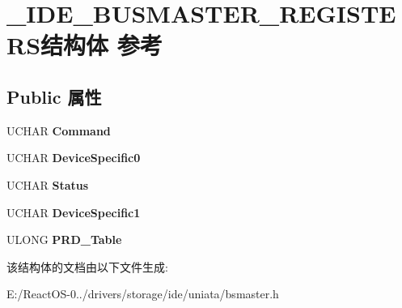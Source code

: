 \hypertarget{struct___i_d_e___b_u_s_m_a_s_t_e_r___r_e_g_i_s_t_e_r_s}{}\section{\+\_\+\+I\+D\+E\+\_\+\+B\+U\+S\+M\+A\+S\+T\+E\+R\+\_\+\+R\+E\+G\+I\+S\+T\+E\+R\+S结构体 参考}
\label{struct___i_d_e___b_u_s_m_a_s_t_e_r___r_e_g_i_s_t_e_r_s}
\subsection*{Public 属性}
\begin{DoxyCompactItemize}
\item 
\mbox{\label{struct___i_d_e___b_u_s_m_a_s_t_e_r___r_e_g_i_s_t_e_r_s_a3e1d123d5a6d4a881dce95d7d1324add}} 
U\+C\+H\+AR {\bfseries Command}
\item 
\mbox{\label{struct___i_d_e___b_u_s_m_a_s_t_e_r___r_e_g_i_s_t_e_r_s_a285bbf18e1f1a1dcab551e1d8a4a041f}} 
U\+C\+H\+AR {\bfseries Device\+Specific0}
\item 
\mbox{\label{struct___i_d_e___b_u_s_m_a_s_t_e_r___r_e_g_i_s_t_e_r_s_a531f8669ec588ecb9132f1dffe121fbd}} 
U\+C\+H\+AR {\bfseries Status}
\item 
\mbox{\label{struct___i_d_e___b_u_s_m_a_s_t_e_r___r_e_g_i_s_t_e_r_s_a092f00b85687d905ef8eb92b267a8a6a}} 
U\+C\+H\+AR {\bfseries Device\+Specific1}
\item 
\mbox{\label{struct___i_d_e___b_u_s_m_a_s_t_e_r___r_e_g_i_s_t_e_r_s_a5288ce4a56c00087f149f83bd5485f5d}} 
U\+L\+O\+NG {\bfseries P\+R\+D\+\_\+\+Table}
\end{DoxyCompactItemize}


该结构体的文档由以下文件生成\+:\begin{DoxyCompactItemize}
\item 
E\+:/\+React\+O\+S-\/0../drivers/storage/ide/uniata/bsmaster.\+h\end{DoxyCompactItemize}

